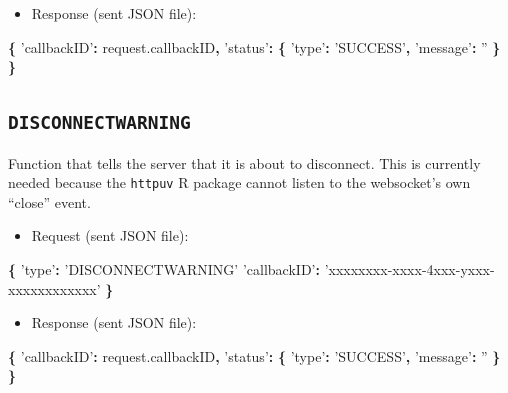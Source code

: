 \documentclass[]{book}
\newenvironment{Shaded}{\begin{snugshade}}{\end{snugshade}}
\newcommand{\AttributeTok}[1]{\textcolor[rgb]{0.77,0.63,0.00}{#1}}
\newcommand{\NormalTok}[1]{#1}
\newcommand{\OperatorTok}[1]{\textcolor[rgb]{0.81,0.36,0.00}{\textbf{#1}}}
\newcommand{\StringTok}[1]{\textcolor[rgb]{0.31,0.60,0.02}{#1}}
\newcommand{\VariableTok}[1]{\textcolor[rgb]{0.00,0.00,0.00}{#1}}
\providecommand{\tightlist}{%
  \setlength{\itemsep}{0pt}\setlength{\parskip}{0pt}}
\begin{document}
\begin{itemize}
\tightlist
\item
  Response (sent JSON file):
\end{itemize}

\begin{Shaded}
\begin{Highlighting}[]
\OperatorTok{\{}
  \StringTok{'callbackID'}\OperatorTok{:} \VariableTok{request}\NormalTok{.}\AttributeTok{callbackID}\OperatorTok{,}
  \StringTok{'status'}\OperatorTok{:} \OperatorTok{\{}
    \StringTok{'type'}\OperatorTok{:} \StringTok{'SUCCESS'}\OperatorTok{,}
    \StringTok{'message'}\OperatorTok{:} \StringTok{''}
  \OperatorTok{\}}
\OperatorTok{\}}
\end{Highlighting}
\end{Shaded}

\hypertarget{disconnectwarning}{%
\subsection{\texorpdfstring{\texttt{DISCONNECTWARNING}}{DISCONNECTWARNING}}\label{disconnectwarning}}

Function that tells the server that it is about to disconnect. This is currently needed because the \texttt{httpuv} R package cannot listen to the websocket's own ``close'' event.

\begin{itemize}
\tightlist
\item
  Request (sent JSON file):
\end{itemize}

\begin{Shaded}
\begin{Highlighting}[]
\OperatorTok{\{}
  \StringTok{'type'}\OperatorTok{:} \StringTok{'DISCONNECTWARNING'}
  \StringTok{'callbackID'}\OperatorTok{:} \StringTok{'xxxxxxxx-xxxx-4xxx-yxxx-xxxxxxxxxxxx'}
\OperatorTok{\}}
\end{Highlighting}
\end{Shaded}

\begin{itemize}
\tightlist
\item
  Response (sent JSON file):
\end{itemize}

\begin{Shaded}
\begin{Highlighting}[]
\OperatorTok{\{}
  \StringTok{'callbackID'}\OperatorTok{:} \VariableTok{request}\NormalTok{.}\AttributeTok{callbackID}\OperatorTok{,}
  \StringTok{'status'}\OperatorTok{:} \OperatorTok{\{}
    \StringTok{'type'}\OperatorTok{:} \StringTok{'SUCCESS'}\OperatorTok{,}
    \StringTok{'message'}\OperatorTok{:} \StringTok{''}
  \OperatorTok{\}}
\OperatorTok{\}}
\end{Highlighting}
\end{Shaded}
\end{document}
